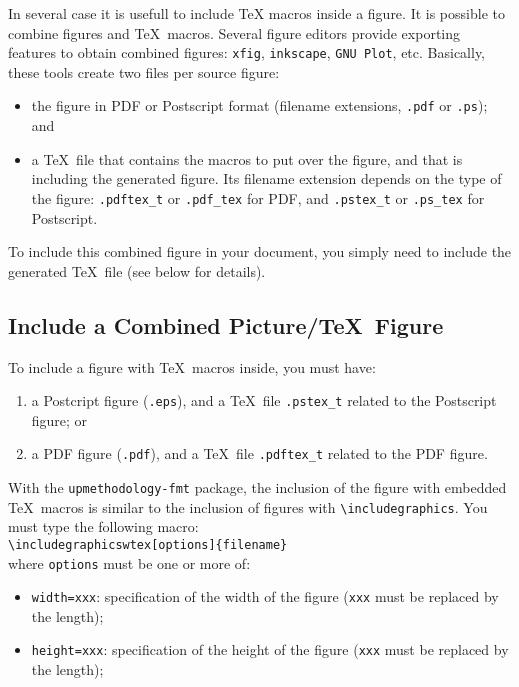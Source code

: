 \documentclass[book]{upmethodology-document}
\begin{document}
In several case it is usefull to include \TeX\xspace macros inside a figure. It is possible to combine figures and \TeX\ macros. Several figure editors provide exporting features to obtain combined figures: \texttt{xfig}, \texttt{inkscape}, \texttt{GNU Plot}, etc. Basically, these tools create two files per source figure: \begin{itemize}
\item the figure in PDF or Postscript format (filename extensions, \texttt{.pdf} or \texttt{.ps}); and
\item a \TeX\ file that contains the macros to put over the figure, and that is including the generated figure. Its filename extension depends on the type of the figure: \texttt{.pdftex\_t} or \texttt{.pdf\_tex} for PDF, and \texttt{.pstex\_t} or \texttt{.ps\_tex} for Postscript.
\end{itemize}
To include this combined figure in your document, you simply need to include the generated \TeX\ file (see below for details).

\subsection{Include a Combined Picture/\TeX\ Figure}

To include a figure with \TeX\ macros inside, you must have: \begin{enumerate}
\item a Postcript figure (\texttt{.eps}), and a \TeX\ file \texttt{.pstex\_t} related to the Postscript figure; or
\item a PDF figure (\texttt{.pdf}), and a \TeX\ file \texttt{.pdftex\_t} related to the PDF figure.
\end{enumerate}

With the \texttt{upmethodology-fmt} package, the inclusion of the figure with embedded \TeX\ macros is similar to the inclusion of figures with \texttt{{\textbackslash}includegraphics}. You must type the following macro: \\
\texttt{{\textbackslash}includegraphicswtex[options]\{filename\}} \\
where \texttt{options} must be one or more of: \begin{itemize}
\item \texttt{width=xxx}: specification of the width of the figure (\texttt{xxx} must be replaced by the length);
\item \texttt{height=xxx}: specification of the height of the figure (\texttt{xxx} must be replaced by the length);
\end{itemize}
\end{document}
